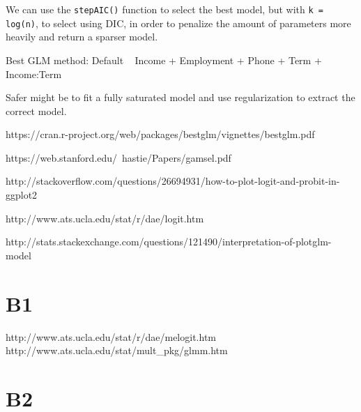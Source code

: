 We can use the \lstinline{stepAIC()} function to select the best model, but with \lstinline{k = log(n)}, to select using DIC, in order to penalize the amount of parameters more heavily and return a sparser model.

Best GLM method:
Default ~ Income + Employment + Phone + Term + Income:Term

Safer might be to fit a fully saturated model and use regularization to extract the correct model. 


https://cran.r-project.org/web/packages/bestglm/vignettes/bestglm.pdf

https://web.stanford.edu/~hastie/Papers/gamsel.pdf

http://stackoverflow.com/questions/26694931/how-to-plot-logit-and-probit-in-ggplot2

http://www.ats.ucla.edu/stat/r/dae/logit.htm

http://stats.stackexchange.com/questions/121490/interpretation-of-plotglm-model


\section{B1}


http://www.ats.ucla.edu/stat/r/dae/melogit.htm
http://www.ats.ucla.edu/stat/mult_pkg/glmm.htm



\section{B2}


